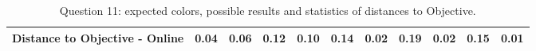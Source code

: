\begin{table}[H]
{\begin{tabular}{lccccccccccccc}
    \multicolumn{4}{l}{Distance to Objective - Online}                                                                                               & \multicolumn{1}{|c}{\textbf{0.04}}        & \multicolumn{1}{c|}{0.06}    & \multicolumn{1}{|c}{0.12}        & \multicolumn{1}{c|}{0.10}    & \multicolumn{1}{|c}{0.14}       & \multicolumn{1}{c|}{0.02}    & \multicolumn{1}{|c}{0.19}        & \multicolumn{1}{c|}{0.02}    & \multicolumn{1}{|c}{0.15}       & \multicolumn{1}{c|}{0.01}    \\ \hline
    \end{tabular}}
  \caption[Question 11, with expected Results.]{Question 11: expected colors, possible results and statistics of distances to Objective.}
  \vspace{-5pt}
  \label{table:lab_q11_expected}
\end{table}
%
